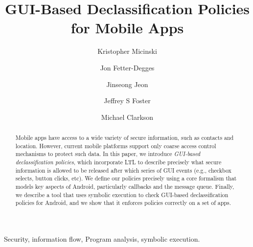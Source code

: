 \documentclass{entcs} \usepackage{entcsmacro}
\begin{document}
\begin{frontmatter}
  \title{GUI-Based Declassification Policies \\ for Mobile Apps}
  \author{Kristopher Micinski}
  \address{Department of Computer Science\\ University of Maryland,
    College Park\\
    College Park, MD, USA} 

  \author{Jon Fetter-Degges}
  \address{Department of Computer Science\\ University of Maryland,
    College Park\\
    College Park, MD, USA} 

  \author{Jinseong Jeon}
  \address{Department of Computer Science\\ University of Maryland,
    College Park\\
    College Park, MD, USA} 

  \author{Jeffrey S Foster}
  \address{Department of Computer Science\\ University of Maryland,
    College Park\\
    College Park, MD, USA} 

  \author{Michael Clarkson}
  \address{Department of Computer Science\\ Cornell University, \\
    Ithaca, NY, USA} 
\begin{abstract} 
  Mobile apps have access to a wide variety of secure information,
  such as contacts and location. However, current mobile platforms
  support only coarse access control mechanisms to protect such
  data. In this paper, we introduce \emph{GUI-based declassification
    policies}, which incorporate LTL to describe precisely what secure
  information is allowed to be released after which series of GUI
  events (e.g., checkbox selects, button clicks, etc). We define our
  policies precisely using a core formalism that models key aspects of
  Android, particularly callbacks and the message queue. Finally, we
  describe a tool that uses symbolic execution to check GUI-based
  declassification policies for Android, and we show that it enforces
  policies correctly on a set of apps.
\end{abstract}
\begin{keyword}
  Security, information flow, Program analysis, symbolic execution.
\end{keyword}
\end{frontmatter}
\end{document}
